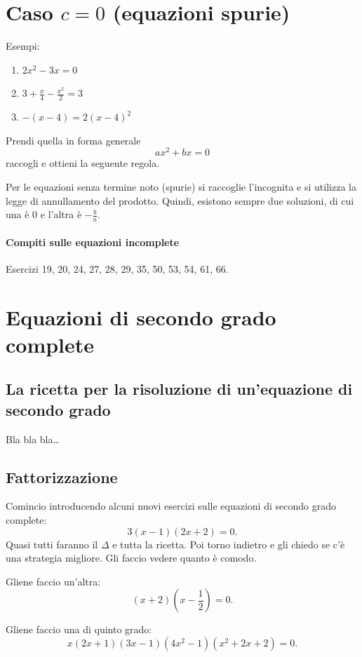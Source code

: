 \documentclass[11pt]{report}
\begin{document}
\section{Caso $c=0$ (equazioni spurie)}

Esempi:
\begin{enumerate}
    \item $2x^2-3x=0$
    \item $3+\frac x4-\frac {x^2}2=3$
    \item $-(x-4)=2(x-4)^2$
\end{enumerate}

Prendi quella in forma generale
$$
ax^2+bx=0
$$
raccogli e ottieni la seguente regola.
\begin{mdframed}
    Per le equazioni senza termine noto (spurie) si raccoglie l'incognita e si utilizza la legge di annullamento del prodotto. Quindi, esistono sempre due soluzioni, di cui una è $0$ e l'altra è $-\frac ba$. 
\end{mdframed}

\paragraph{Compiti sulle equazioni incomplete}
Esercizi 19, 20, 24, 27, 28, 29, 35, 50, 53, 54, 61, 66.

\section{Equazioni di secondo grado complete}

\subsection{La ricetta per la risoluzione di un'equazione di secondo grado}
Bla bla bla\dots

\subsection{Fattorizzazione}

Comincio introducendo alcuni nuovi esercizi sulle equazioni di secondo grado complete:
$$
3(x-1)(2x+2)=0.
$$
Quasi tutti faranno il $\Delta$ e tutta la ricetta. Poi torno indietro e gli chiedo se c'è una strategia migliore. Gli faccio vedere quanto è comodo.

Gliene faccio un'altra:
$$
(x+2)(x-\frac 12)=0.
$$

Gliene faccio una di quinto grado:
$$
x(2x+1)(3x-1)(4x^2-1)(x^2+2x+2)=0.
$$
\end{document}
